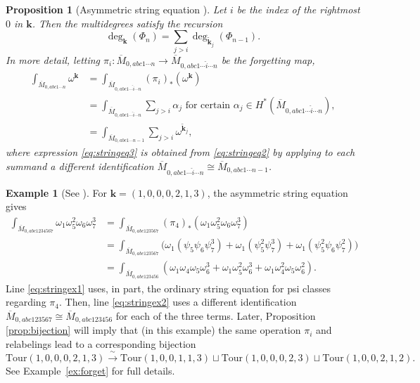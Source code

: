 \documentclass[11pt]{amsart}
\newcommand{\Mbar}{\overline{M}}
\newcommand{\emb}{\Phi}
\newcommand{\Tour}{\mathrm{Tour}}
\newtheorem{prop}[thm]{Proposition}
\numberwithin{thm}{section}
\numberwithin{equation}{section}
\numberwithin{figure}{section}
\theoremstyle{definition}
\newtheorem{example}[thm]{Example}
\begin{document}
\begin{prop}[Asymmetric string equation {\cite[Prop 4.10]{CGM}}]\label{prop:recursion}  Let $i$ be the index of the rightmost $0$ in $\mathbf{k}$.  Then the  multidegrees satisfy the recursion
\begin{equation} \label{eq:string}
    \deg_{\mathbf{k}}(\emb_n)=\sum_{j>i}\deg_{\widetilde{\mathbf{k}}_j}(\emb_{n-1}).
\end{equation}
In more detail, letting $\pi_i : \Mbar_{0, abc1\cdots n} \to \Mbar_{0, abc1\cdots\hat{i}\cdots n}$ be the forgetting map, %
\begin{align} \label{eq:stringeq1}
    \int_{\Mbar_{0, abc1\cdots n}} \omega^\mathbf{k} &= \int_{\Mbar_{0, abc1\cdots\hat{i}\cdots n}} (\pi_i)_*(\omega^\mathbf{k}) \\ \label{eq:stringeq2}
    &= \int_{\Mbar_{0, abc1\cdots\hat{i}\cdots n}} \sum_{j > i} \alpha_j \text{ for certain } \alpha_j \in H^*(\Mbar_{0, abc1\cdots\hat{i}\cdots n}), \\ \label{eq:stringeq3}
    &= \int_{\Mbar_{0, abc1\cdots n{-}1}} \sum_{j > i} \omega^{\widetilde{\mathbf{k}}_j},
\end{align}
where expression \eqref{eq:stringeq3} is obtained from \eqref{eq:stringeq2} by applying to each summand a \emph{different} identification $\Mbar_{0, abc1\cdots\hat{i}\cdots n} \cong \Mbar_{0, abc1\cdots n{-}1}$.
\end{prop}

\begin{example}[See {\cite[Ex. 4.6]{CGM}}] \label{ex:stringex}
For $\mathbf{k} = (1, 0, 0, 0, 2, 1, 3)$, the asymmetric string equation gives
\begin{align}
\int_{\Mbar_{0,abc1234567}}\omega_1\omega_5^2\omega_6\omega_7^3
 &= \int_{\Mbar_{0, abc123567}} (\pi_4)_*(\omega_1\omega_5^2\omega_6\omega_7^3) \\
\label{eq:stringex1}
 &= \int_{\Mbar_{0, abc123567}}\big(\omega_1(\psi_5\psi_6\psi_7^3) + \omega_1(\psi_5^2\psi_7^3) + \omega_1(\psi_5^2\psi_6\psi_7^2) \big)\\ \label{eq:stringex2}
&= \int_{\Mbar_{0,abc123456}}(\omega_1\omega_4\omega_5\omega_6^3 +
\omega_1\omega_5^2\omega_6^3 +
\omega_1\omega_4^2\omega_5\omega_6^2).
\end{align}
Line \eqref{eq:stringex1} uses, in part, the ordinary string equation for psi classes regarding $\pi_4$. Then, line \eqref{eq:stringex2} uses a different identification $\Mbar_{0, abc123567} \cong \Mbar_{0, abc123456}$ for each of the three terms. Later, Proposition \ref{prop:bijection} will imply that (in this example) the same operation $\pi_i$ and relabelings lead to a corresponding bijection
\begin{equation*}
\Tour(1,0,0,0,2,1,3) \xrightarrow{\ \sim\ } \Tour(1,0,0,1,1,3) \sqcup \Tour(1,0,0,0,2,3) \sqcup \Tour(1,0,0,2,1,2).
\end{equation*}
See Example~\ref{ex:forget} for full details.
\end{example}
\end{document}
